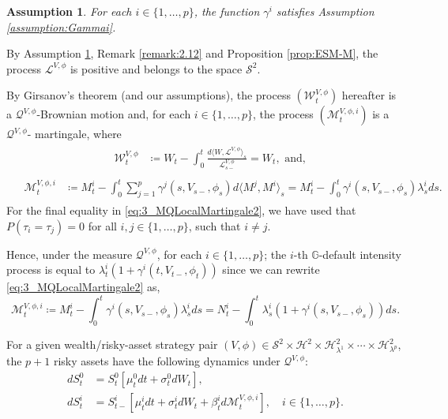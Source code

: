 \documentclass[11pt,a4paper]{article}
\numberwithin{equation}{section}
\theoremstyle{newPlain}
\theoremstyle{newDefinition}
\newtheorem{assumption}{Assumption}[theorem]
\theoremstyle{newRemark}
\begin{document}
\begin{assumption}\label{assumption:Gammai2}
	For each $i\in\{1,\ldots,p\}$, the function $\gamma^i$ satisfies Assumption \ref{assumption:Gammai}.
\end{assumption}
By Assumption \ref{assumption:Gammai2}, Remark \ref{remark:2.12} and Proposition \ref{prop:ESM-M},  the process $\mathscr{L}^{V,\phi}$ is positive and belongs to the space $\mathcal{S}^2$.


By  Girsanov's theorem (and our assumptions),   the process $(\mathscr{W}_t^{V,\phi})$  hereafter is a $\mathcal{Q}^{V,\phi}$-Brownian motion and, for each  $i\in\{1,\ldots,p\}$, the process $(\mathscr{M}_t^{V,\phi,i})$ is a $\mathcal Q^{V,\phi}$- martingale, where 
\begin{align}
    &\begin{aligned}
        \mathscr{W}_t^{V,\phi}&\coloneqq W_t - \int_0^t\frac{d\langle W,\mathscr{L}^{V,\phi}\rangle_s}{\mathscr{L}_{s-}^{V,\phi}}= W_t, \text { and,}
    \end{aligned}\label{eq:3_WQMartingale2}
\end{align}
\begin{align}
    &\begin{aligned}
        \mathscr{M}_t^{V,\phi,i}&\coloneqq  M_t^i - \int_0^t\sum_{j=1}^p\gamma^j(s,V_{s-},\phi_s)d\langle M^j,M^i\rangle_s= M_t^i-\int_0^t\gamma^i(s,V_{s-},\phi_s)\lambda_s^ids.    \end{aligned}\label{eq:3_MQLocalMartingale2}
\end{align}
For the final equality in \eqref{eq:3_MQLocalMartingale2}, we have used that $P(\tau_i=\tau_j)=0$ for all $i,j\in\{1,\ldots,p\}$,  such that $i\ne j$. %

Hence, under the measure $\mathcal{Q}^{V,\phi}$, for each $i\in\{1,\ldots,p\}$; the $i$-th $\mathbb{G}$-default intensity process is equal to $\lambda_t^i(1+\gamma^i(t,V_{t-},\phi_t))$ since we can rewrite \eqref{eq:3_MQLocalMartingale2} as,
\begin{equation*}
    \mathscr{M}_t^{V,\phi,i}\coloneqq M_t^i - \int_0^t\gamma^i(s,V_{s-},\phi_s)\lambda_s^ids = N_t^i - \int_0^t\lambda_s^i(1+\gamma^i(s,V_{s-},\phi_s))ds.
\end{equation*}

For a given  wealth/risky-asset strategy pair $(V,\phi)\in\mathcal{S}^2\times\mathcal{H}^2\times\mathcal{H}_{\lambda^1}^2\times\cdots\times\mathcal{H}_{\lambda^p}^2$,  the $p+1$ risky assets have the   following dynamics  under $\mathcal{Q}^{V,\phi}$:
\begin{align*}
    dS_t^0 &= S_t^0[\mu_t^0dt + \sigma_t^0dW_t],\\
    dS_t^i &= S_{t-}^i[\mu_t^idt + \sigma_t^idW_t + \beta_t^id\mathscr{M}_t^{V,\phi,i}],\quad i\in\{1,\ldots,p\}.
\end{align*}
\end{document}
